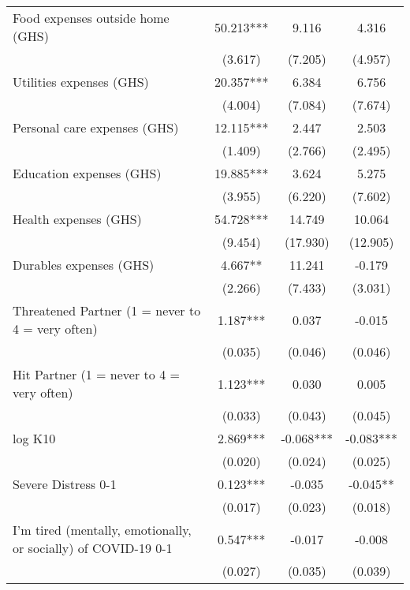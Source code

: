 \begin{ThreePartTable}
\begin{table}[tbp]
\begin{tabular}{lccc}
 Food expenses outside home (GHS) & 50.213*** & 9.116 & 4.316 \\ [0.1em] 
                   &      (3.617)     &      (7.205)     &      (4.957)     \\ [0.1em] 
 Utilities expenses (GHS) & 20.357*** & 6.384 & 6.756 \\ [0.1em] 
                   &      (4.004)     &      (7.084)     &      (7.674)     \\ [0.1em] 
 Personal care expenses (GHS) & 12.115*** & 2.447 & 2.503 \\ [0.1em] 
                   &      (1.409)     &      (2.766)     &      (2.495)     \\ [0.1em] 
 Education expenses (GHS) & 19.885*** & 3.624 & 5.275 \\ [0.1em] 
                   &      (3.955)     &      (6.220)     &      (7.602)     \\ [0.1em] 
 Health expenses (GHS) & 54.728*** & 14.749 & 10.064 \\ [0.1em] 
                   &      (9.454)     &      (17.930)     &      (12.905)     \\ [0.1em] 
 Durables expenses (GHS) & 4.667** & 11.241 & -0.179 \\ [0.1em] 
                   &      (2.266)     &      (7.433)     &      (3.031)     \\ [0.1em] 
 Threatened Partner (1 = never to 4 = very often) & 1.187*** & 0.037 & -0.015 \\ [0.1em] 
                   &      (0.035)     &      (0.046)     &      (0.046)     \\ [0.1em] 
 Hit Partner (1 = never to 4 = very often) & 1.123*** & 0.030 & 0.005 \\ [0.1em] 
                   &      (0.033)     &      (0.043)     &      (0.045)     \\ [0.1em] 
 log K10 & 2.869*** & -0.068*** & -0.083*** \\ [0.1em] 
                   &      (0.020)     &      (0.024)     &      (0.025)     \\ [0.1em] 
 Severe Distress 0-1 & 0.123*** & -0.035 & -0.045** \\ [0.1em] 
                   &      (0.017)     &      (0.023)     &      (0.018)     \\ [0.1em] 
 I'm tired (mentally, emotionally, or socially) of COVID-19 0-1 & 0.547*** & -0.017 & -0.008 \\ [0.1em] 
                   &      (0.027)     &      (0.035)     &      (0.039)     \\ [0.1em] 

\end{tabular}
\end{table}
\end{ThreePartTable}
